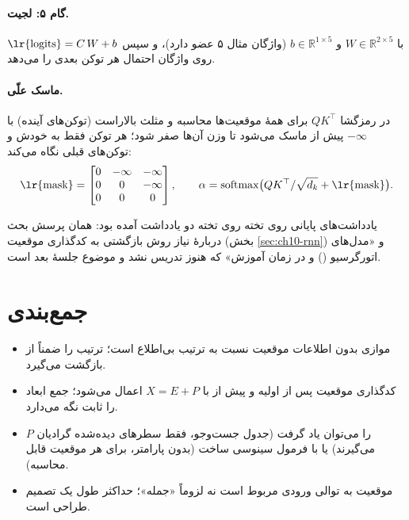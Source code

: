 \paragraph{گام ۵: لجیت.} $\text{\lr{logits}} = C\,W + b$ با $W\in\mathbb{R}^{2\times 5}$ و $b\in\mathbb{R}^{1\times 5}$ (واژگان مثال ۵ عضو دارد)، و سپس  روی واژگان احتمال هر توکن بعدی را می‌دهد.

\paragraph{ماسک علّی.} در رمزگشا $QK^{\top}$ برای همهٔ موقعیت‌ها محاسبه و مثلث بالا‌راست (توکن‌های آینده) با $-\infty$ پیش از  ماسک می‌شود تا وزن آن‌ها صفر شود؛ هر توکن فقط به خودش و توکن‌های قبلی نگاه می‌کند:
\[
\text{\lr{mask}}=\begin{bmatrix}0&-\infty&-\infty\\0&0&-\infty\\0&0&0\end{bmatrix},\qquad
\alpha=\mathrm{softmax}\big(QK^\top/\sqrt{d_k}+\text{\lr{mask}}\big).
\]

\begin{exambox}{یادداشت‌های پایانی روی تخته}
روی تخته دو یادداشت آمده بود: همان پرسش بحث دربارهٔ نیاز روش بازگشتی به کدگذاری موقعیت (بخش \ref{sec:ch10-rnn}) و «مدل‌های اتورگرسیو () و  در زمان آموزش» که هنوز تدریس نشد و موضوع جلسهٔ بعد است.
\end{exambox}

\section{جمع‌بندی}
\begin{itemize}
  \item {} موازی بدون اطلاعات موقعیت نسبت به ترتیب بی‌اطلاع است؛  ترتیب را ضمناً از بازگشت می‌گیرد.
  \item کدگذاری موقعیت پس از  اولیه و پیش از  با $X=E+P$ اعمال می‌شود؛ جمع ابعاد را ثابت نگه می‌دارد.
  \item $P$ را می‌توان یاد گرفت (جدول جست‌وجو، فقط سطرهای دیده‌شده گرادیان می‌گیرند) یا با فرمول سینوسی ساخت (بدون پارامتر، برای هر موقعیت قابل محاسبه).
  \item موقعیت به توالی ورودی مربوط است نه لزوماً «جمله»؛ حداکثر طول یک تصمیم طراحی است.
\end{itemize}

